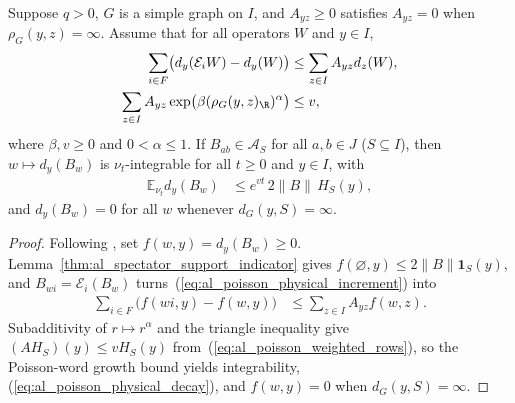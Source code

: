 \begin{lemma}
    \label{thm:al_channel_poisson_kernel_growth}
    \leanok
    Suppose $q>0$, $G$ is a simple graph on $I$, and $A_{yz}\ge0$ satisfies
    $A_{yz}=0$ when $\rho_G(y,z)=\infty$. Assume that for all operators $W$
    and $y\in I$,
    \begin{align}
        \label{eq:al_poisson_physical_increment}
        \sum_{i\in F}\bigl(d_y(\mathcal E_iW)-d_y(W)\bigr)
         & \le\sum_{z\in I}A_{yz}d_z(W), \\
        \label{eq:al_poisson_weighted_rows}
        \sum_{z\in I}A_{yz}
        \exp\bigl(\beta (\rho_G(y,z)_{\R})^\alpha\bigr)
         & \le v,
    \end{align}
    where $\beta,v\ge0$ and $0<\alpha\le1$. If $B_{ab}\in\mathcal A_S$ for all
    $a,b\in J$ ($S\subseteq I$), then $w\mapsto d_y(B_w)$ is
    $\nu_t$-integrable for all $t\ge0$ and $y\in I$, with
    \begin{align}
        \label{eq:al_poisson_physical_decay}
        \mathbb E_{\nu_t}d_y(B_w)
         & \le e^{vt}\,2\|B\|\,H_S(y),
    \end{align}
    and $d_y(B_w)=0$ for all $w$ whenever $d_G(y,S)=\infty$.
\end{lemma}
\begin{proof}
    \leanok
    Following \cite[\texttt{09-amplification.tex}, lines 161--188]{OpenAI2026AreaLaw},
    set $f(w,y)=d_y(B_w)\ge0$. Lemma~\ref{thm:al_spectator_support_indicator}
    gives $f(\varnothing,y)\le2\|B\|\mathbf1_S(y)$, and
    $B_{wi}=\mathcal E_i(B_w)$ turns~(\ref{eq:al_poisson_physical_increment})
    into
    \begin{align}
        \label{eq:al_poisson_append_increment}
        \sum_{i\in F}\bigl(f(wi,y)-f(w,y)\bigr)
         & \le\sum_{z\in I}A_{yz}f(w,z).
    \end{align}
    Subadditivity of $r\mapsto r^\alpha$ and the triangle inequality give
    $(AH_S)(y)\le vH_S(y)$ from~(\ref{eq:al_poisson_weighted_rows}), so the
    Poisson-word growth bound yields integrability,
    (\ref{eq:al_poisson_physical_decay}), and $f(w,y)=0$ when
    $d_G(y,S)=\infty$.
\end{proof}

